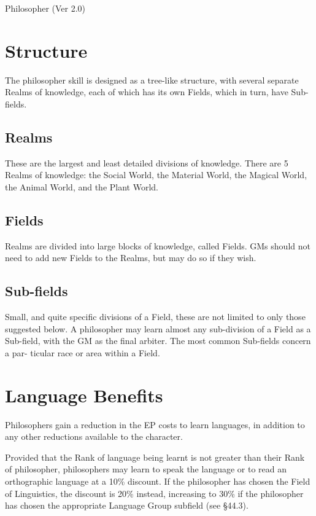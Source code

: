 \begin{Chapter}{Philosopher (Ver 2.0)}
\section{Structure }

The philosopher skill is designed as a tree-like structure, with
several separate Realms of knowledge, each of which has its own
Fields, which in turn, have Sub-fields.

\subsection{Realms}

These are the largest and least detailed divisions of knowledge. There
are 5 Realms of knowledge: the Social World, the Material World, the
Magical World, the Animal World, and the Plant World.

\subsection{Fields}

Realms are divided into large blocks of knowledge, called Fields.  GMs
should not need to add new Fields to the Realms, but may do so if they
wish.

\subsection{Sub-fields}

Small, and quite specific divisions of a Field, these are not limited
to only those suggested below.  A philosopher may learn almost any
sub-division of a Field as a Sub-field, with the GM as the final
arbiter.  The most common Sub-fields concern a par- ticular race or
area within a Field.

\section{Language Benefits}

Philosophers gain a reduction in the EP costs to learn languages, in
addition to any other reductions available to the character.

Provided that the Rank of language being learnt is not greater than
their Rank of philosopher, philosophers may learn to speak the
language or to read an orthographic language at a 10\% discount.  If
the philosopher has chosen the Field of Linguistics, the discount is
20\% instead, increasing to 30\% if the philosopher has chosen the
appropriate Language Group subfield (see §44.3).


\end{Chapter}
